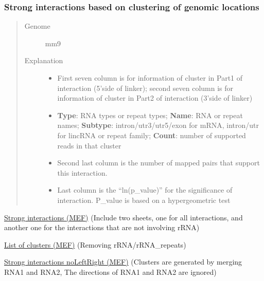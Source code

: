 \documentclass[letterpaper,10pt,english]{sphinxmanual}
\begin{document}
\subsubsection{Strong interactions based on clustering of genomic locations}
\label{Data_Resources:id3}\begin{quote}\begin{description}
\item[{Genome}] \leavevmode
mm9

\item[{Explanation}] \leavevmode\begin{itemize}
\item {} 
First seven column is for information of cluster in Part1 of interaction (5'side of linker); second seven column is for information of cluster in Part2 of interaction (3'side of linker)

\item {} 
\textbf{Type}: RNA types or repeat types; \textbf{Name}: RNA or repeat names; \textbf{Subtype}: intron/utr3/utr5/exon for mRNA, intron/utr for lincRNA or repeat family; \textbf{Count}: number of supported reads in that cluster

\item {} 
Second last column is the number of mapped pairs that support this interaction.

\item {} 
Last column is the ``ln(p\_value)'' for the significance of interaction. P\_value is based on a hypergeometric test

\end{itemize}

\end{description}\end{quote}

\href{http://systemsbio.ucsd.edu/RNA-Hi-C/Data/GGCG\_MEF\_interaction\_clusters.xlsx}{Strong interactions (MEF)} (Include two sheets, one for all interactions, and another one for the interactions that are not involving rRNA)

\href{http://systemsbio.ucsd.edu/RNA-Hi-C/Data/GGCG\_MEF\_cluster\_total\_sort.xlsx}{List of clusters (MEF)} (Removing rRNA/rRNA\_repeats)

\href{http://systemsbio.ucsd.edu/RNA-Hi-C/Data/GGCG\_MEF\_interaction\_clusters\_noLeftRight.xlsx}{Strong interactions noLeftRight (MEF)} (Clusters are generated by merging RNA1 and RNA2, The directions of RNA1 and RNA2 are ignored)
\end{document}
